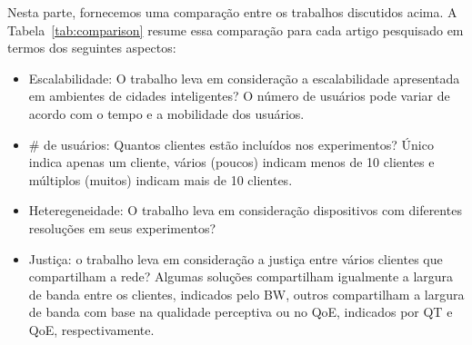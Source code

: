 
Nesta parte, fornecemos uma comparação entre os trabalhos discutidos acima.
A Tabela~\ref{tab:comparison} resume essa comparação para cada artigo pesquisado em termos dos seguintes aspectos:

\begin{itemize}

\item Escalabilidade: O trabalho leva em consideração a escalabilidade apresentada em ambientes de cidades inteligentes? O número de usuários pode variar de acordo com o tempo e a mobilidade dos usuários.

\item \# de usuários: Quantos clientes estão incluídos nos experimentos? Único indica apenas um cliente, vários (poucos) indicam menos de 10 clientes e múltiplos (muitos) indicam mais de 10 clientes.

\item Heteregeneidade: O trabalho leva em consideração dispositivos com diferentes resoluções em seus experimentos?

\item Justiça: o trabalho leva em consideração a justiça entre vários clientes que compartilham a rede? Algumas soluções compartilham igualmente a largura de banda entre os clientes, indicados pelo BW, outros compartilham a largura de banda com base na qualidade perceptiva ou no QoE, indicados por QT e QoE, respectivamente.

\end{itemize}


